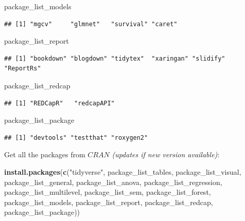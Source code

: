 \documentclass[]{book}
\newenvironment{Shaded}{\begin{snugshade}}{\end{snugshade}}
\newcommand{\KeywordTok}[1]{\textcolor[rgb]{0.13,0.29,0.53}{\textbf{#1}}}
\newcommand{\StringTok}[1]{\textcolor[rgb]{0.31,0.60,0.02}{#1}}
\newcommand{\NormalTok}[1]{#1}
\theoremstyle{definition}
\theoremstyle{definition}
\theoremstyle{definition}
\theoremstyle{remark}
\begin{document}
\begin{Shaded}
\begin{Highlighting}[]
\NormalTok{package_list_models}
\end{Highlighting}
\end{Shaded}

\begin{verbatim}
## [1] "mgcv"     "glmnet"   "survival" "caret"
\end{verbatim}

\begin{Shaded}
\begin{Highlighting}[]
\NormalTok{package_list_report}
\end{Highlighting}
\end{Shaded}

\begin{verbatim}
## [1] "bookdown" "blogdown" "tidytex"  "xaringan" "slidify"  "ReportRs"
\end{verbatim}

\begin{Shaded}
\begin{Highlighting}[]
\NormalTok{package_list_redcap}
\end{Highlighting}
\end{Shaded}

\begin{verbatim}
## [1] "REDCapR"   "redcapAPI"
\end{verbatim}

\begin{Shaded}
\begin{Highlighting}[]
\NormalTok{package_list_package}
\end{Highlighting}
\end{Shaded}

\begin{verbatim}
## [1] "devtools" "testthat" "roxygen2"
\end{verbatim}

Get all the packages from \(CRAN\) \emph{(updates if new version
available)}:

\begin{Shaded}
\begin{Highlighting}[]
\KeywordTok{install.packages}\NormalTok{(}\KeywordTok{c}\NormalTok{(}\StringTok{"tidyverse"}\NormalTok{,}
\NormalTok{                   package_list_tables,}
\NormalTok{                   package_list_visual,}
\NormalTok{                   package_list_general,}
\NormalTok{                   package_list_anova,}
\NormalTok{                   package_list_regression,}
\NormalTok{                   package_list_multilevel,}
\NormalTok{                   package_list_sem,}
\NormalTok{                   package_list_forest,}
\NormalTok{                   package_list_models,}
\NormalTok{                   package_list_report,}
\NormalTok{                   package_list_redcap,}
\NormalTok{                   package_list_package))}
\end{Highlighting}
\end{Shaded}
\end{document}
